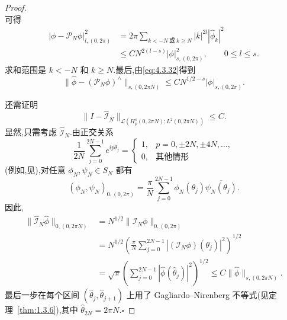 \begin{proof}
\begin{equation}
\end{equation}
可得
\begin{equation}\label{eq:4.3.34}
  \begin{aligned}
    |\phi-\mathcal P_N\phi|_{l,(0,2\pi)}^2
    &=2\pi\sum_{k<-N\ \text{或}\ k\ge N}|k|^{2l}|\widehat\phi_k|^2\\
    &\le CN^{2(l-s)}|\phi|_{s,(0,2\pi)}^2,\qquad 0\le l\le s.
  \end{aligned}
\end{equation}
求和范围是 \(k<-N\) 和 \(k\ge N\).最后,由\eqref{eq:4.3.32}得到
\begin{equation}\label{eq:4.3.35}
  \|\widehat\phi-(\mathcal P_N\phi)^\wedge\|_{s,(0,2\pi N)}
  \le CN^{1/2-s}|\phi|_{s,(0,2\pi)}.
\end{equation}

还需证明
\[
  \|I-\widehat{\mathcal I}_N\|_{\mathcal L(H_p^s(0,2\pi N);L^2(0,2\pi N))}
  \le C.
\]
显然,只需考虑 \(\widehat{\mathcal I}_N\).由正交关系
\[
  \frac1{2N}\sum_{j=0}^{2N-1}e^{ip\theta_j}
  =\begin{cases}
    1,&p=0,\pm2N,\pm4N,\ldots,\\
    0,&\text{其他情形}
  \end{cases}
\]
(例如,见),对任意 \(\phi_N,\psi_N\in S_N\) 都有
\[
  (\phi_N,\psi_N)_{0,(0,2\pi)}
  =\frac\pi N\sum_{j=0}^{2N-1}\phi_N(\theta_j)\overline{\psi_N(\theta_j)}.
\]
因此,
\[
  \begin{aligned}
    \|\widehat{\mathcal I}_N\widehat\phi\|_{0,(0,2\pi N)}
      &=N^{1/2}\|\mathcal I_N\phi\|_{0,(0,2\pi)}\\
      &=N^{1/2}\left(\frac\pi N\sum_{j=0}^{2N-1}
        |(\mathcal I_N\phi)(\theta_j)|^2\right)^{1/2}\\
      &=\sqrt\pi\left(\sum_{j=0}^{2N-1}|\widehat\phi(\widehat\theta_j)|^2\right)^{1/2}
       \le C\|\widehat\phi\|_{s,(0,2\pi N)}.
  \end{aligned}
\]
最后一步在每个区间 \((\widehat\theta_j,\widehat\theta_{j+1})\) 上用了 Gagliardo--Nirenberg 不等式(见定理~\ref{thm:1.3.6}),其中 \(\widehat\theta_{2N}=2\pi N\).\hfill\(\square\)
\end{proof}

